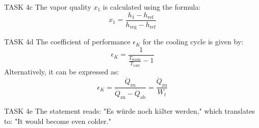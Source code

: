 TASK 4c  
The vapor quality \( x_1 \) is calculated using the formula:  
\[
x_1 = \frac{h_1 - h_{\text{ref}}}{h_{\text{reg}} - h_{\text{ref}}}
\]  

TASK 4d  
The coefficient of performance \( \epsilon_K \) for the cooling cycle is given by:  
\[
\epsilon_K = \frac{1}{\frac{T_{\text{warm}}}{T_{\text{cold}}} - 1}
\]  
Alternatively, it can be expressed as:  
\[
\epsilon_K = \frac{\dot{Q}_{\text{zu}}}{\dot{Q}_{\text{zu}} - \dot{Q}_{\text{ab}}} = \frac{\dot{Q}_{\text{zu}}}{W_t}
\]  

TASK 4e  
The statement reads: "Es würde noch kälter werden," which translates to: "It would become even colder."